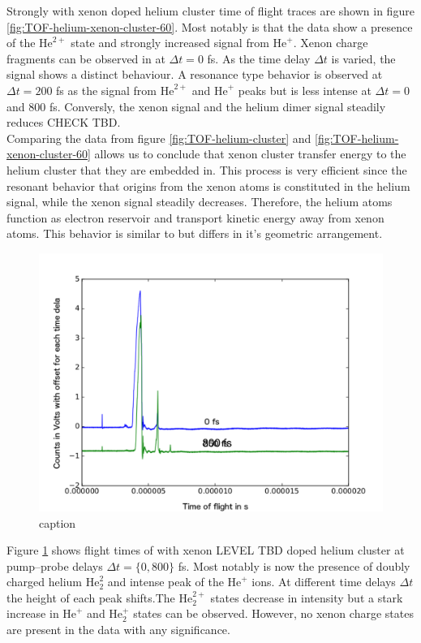 Strongly with xenon doped helium cluster time of flight traces are shown in figure \ref{fig:TOF-helium-xenon-cluster-60}. Most notably is that the data show a presence of the $\text{He}^{2+}$ state and strongly increased signal from $\text{He}^{+}$. Xenon charge fragments can be observed in at $\Delta t = 0$ fs. As the time delay $\Delta t$ is varied, the signal shows a distinct behaviour. A resonance type behavior is observed at $\Delta t = 200$ fs as the signal from $\text{He}^{2+}$ and $\text{He}^{+}$ peaks but is less intense at $\Delta t = 0$ and 800 fs. Conversly, the xenon signal and the helium dimer signal steadily reduces CHECK TBD.\\
Comparing the data from figure \ref{fig:TOF-helium-cluster} and \ref{fig:TOF-helium-xenon-cluster-60} allows us to conclude that xenon cluster transfer energy to the helium cluster that they are embedded in. This process is very efficient since the resonant behavior that origins from the xenon atoms is constituted in the helium signal, while the xenon signal steadily decreases. Therefore, the helium atoms function as electron reservoir and transport kinetic energy away from xenon atoms. This behavior is similar to \citep{Hoener-2008-JPB} but differs in it's geometric arrangement.\\
\begin{figure}
 	\centering
 		\includegraphics[width=1.00\textwidth]{images/results/TOF-helium-xenon-cluster-30.png}
 	\caption{caption}
 	\label{fig:TOF-helium-xenon-cluster-30}
\end{figure}
Figure \ref{fig:TOF-helium-xenon-cluster-30} shows flight times of with xenon LEVEL TBD doped helium cluster at pump--probe delays $\Delta t=\{0, 800\}$ fs. Most notably is now the presence of doubly charged helium $\text{He}_{2}^{2}$ and intense peak of the $\text{He}^{+}$ ions. At different time delays $\Delta t$ the height of each peak shifts.The $\text{He}_{2}^{2+}$ states decrease in intensity but a stark increase in $\text{He}^{+}$ and $\text{He}_{2}^{+}$ states can be observed. However, no xenon charge states are present in the data with any significance.\\
%
%
%
